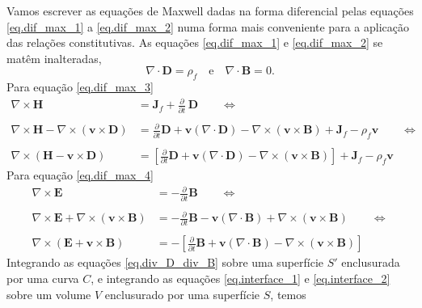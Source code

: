 Vamos escrever as equa\c{c}\~oes de Maxwell dadas na forma diferencial pelas equa\c{c}\~oes \ref{eq.dif_max_1} a \ref{eq.dif_max_2} numa forma mais conveniente para a aplica\c{c}\~ao das rela\c{c}\~oes constitutivas. As equa\c{c}\~oes \ref{eq.dif_max_1} e \ref{eq.dif_max_2} se mat\^em inalteradas,
\begin{equation}\label{eq.div_D_div_B}
\nabla\cdot\mathbf{D}=\rho_f\quad\text{e}\quad\nabla\cdot\mathbf{B}=0.
\end{equation}
Para equa\c{c}\~ao \ref{eq.dif_max_3}
\begin{align}\label{eq.interface_1}\nonumber
\nabla\times\mathbf{H}&=\mathbf{J}_f+\frac{\partial}{\partial t}\,\mathbf{D}\qquad\Leftrightarrow\\\nonumber\\
\nabla\times\mathbf{H}-\nabla\times(\mathbf{v}\times\mathbf{D})&=\frac{\partial}{\partial t}\mathbf{D}+\mathbf{v}(\nabla\cdot\mathbf{D})-\nabla\times(\mathbf{v}\times\mathbf{B})+\mathbf{J}_f-\rho_f\mathbf{v}\qquad\Leftrightarrow\\\nonumber\\
\nabla\times(\mathbf{H}-\mathbf{v}\times\mathbf{D})&=\left[\frac{\partial}{\partial t}\mathbf{D}+\mathbf{v}(\nabla\cdot\mathbf{D})-\nabla\times(\mathbf{v}\times\mathbf{B})\right]+\mathbf{J}_f-\rho_f\mathbf{v}
\end{align}
Para equa\c{c}\~ao \ref{eq.dif_max_4}
\begin{align}\label{eq.interface_2}\nonumber
\nabla\times\mathbf{E}&=-\frac{\partial}{\partial t}\mathbf{B}\qquad\Leftrightarrow\\\nonumber\\
\nabla\times\mathbf{E}+\nabla\times(\mathbf{v}\times\mathbf{B})&=-\frac{\partial}{\partial t}\mathbf{B}-\mathbf{v}(\nabla\cdot\mathbf{B})+\nabla\times(\mathbf{v}\times\mathbf{B})\qquad\Leftrightarrow\\\nonumber\\
\nabla\times(\mathbf{E}+\mathbf{v}\times\mathbf{B})&=-\left[\frac{\partial}{\partial t}\mathbf{B}+\mathbf{v}(\nabla\cdot\mathbf{B})-\nabla\times(\mathbf{v}\times\mathbf{B})\right]
\end{align}
Integrando as equa\c{c}\~oes \ref{eq.div_D_div_B} sobre uma superf\'icie $S'$ enclusurada por uma curva $C$, e integrando as equa\c{c}\~oes \ref{eq.interface_1} e \ref{eq.interface_2} sobre um volume $V$ enclusurado por uma superf\'icie $S$, temos

